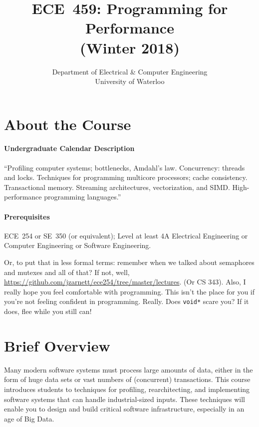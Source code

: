 \documentclass[letterpaper,10pt]{article}
\date{}
\let\LaTeXtitle\title
\renewcommand{\title}[1]{\LaTeXtitle{\textsf{#1}}}
\begin{document}
\title{\bf\LARGE ECE~459: Programming for Performance\\ (Winter 2018)}
\author{Department of Electrical \& Computer Engineering \\
                University of Waterloo}
\renewcommand{\today}{}
\maketitle
\vspace*{-2em}

\section*{About the Course}

\paragraph{Undergraduate Calendar Description} ``Profiling computer systems; bottlenecks, Amdahl's law. Concurrency: threads and locks. Techniques for programming multicore processors; cache consistency. Transactional memory. Streaming architectures, vectorization, and SIMD. High-performance programming languages.''

\paragraph{Prerequisites} ECE~254 or SE~350 (or equivalent); Level at least 4A Electrical Engineering or Computer Engineering or Software Engineering.

Or, to put that in less formal terms: remember when we talked about semaphores and mutexes and all of that? If not, well, \url{https://github.com/jzarnett/ece254/tree/master/lectures}. (Or CS 343). Also, I really hope you feel comfortable with programming. This isn't the place for you if you're not feeling confident in programming. Really. Does \texttt{void*} scare you? If it does, flee while you still can!

\section*{Brief Overview}

Many modern software systems must process large amounts of data, either in the
form of huge data sets or vast numbers of (concurrent) transactions.  This
course introduces students to techniques for profiling, rearchitecting, and
implementing software systems that can handle industrial-sized
inputs. These techniques will enable you to design and build
critical software infrastructure, especially in an age of Big Data.
\end{document}
